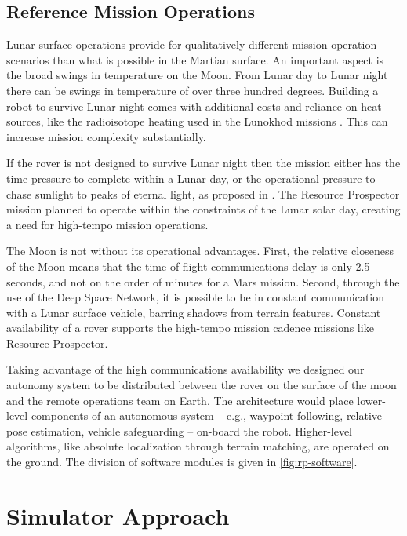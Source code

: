 \documentclass[twocolumn,letterpaper]{IEEEAerospaceCLS}  %
\begin{document}
\subsection{Reference Mission Operations}
Lunar surface operations provide for qualitatively different mission operation scenarios than what is possible in the Martian surface.
An important aspect is the broad swings in temperature on the Moon.  
From Lunar day to Lunar night there can be swings in temperature of over three hundred degrees.  
Building a robot to survive Lunar night comes with additional costs and reliance on heat sources, like the radioisotope heating used in the Lunokhod missions \cite{ulamec2010survive}.
This can increase mission complexity substantially.  

If the rover is not designed to survive Lunar night then the mission either has the time pressure to complete within a Lunar day, or the operational pressure to chase sunlight to peaks of eternal light, as proposed in \cite{otten2018strategic}.
The Resource Prospector mission planned to operate within the constraints of the Lunar solar day, creating a need for high-tempo mission operations. 

The Moon is not without its operational advantages.
First, the relative closeness of the Moon means that the time-of-flight communications delay is only 2.5 seconds, and not on the order of minutes for a Mars mission.  
Second, through the use of the Deep Space Network, it is possible to be in constant communication with a Lunar surface vehicle, barring shadows from terrain features.  
Constant availability of a rover supports the high-tempo mission cadence missions like Resource Prospector.

Taking advantage of the high communications availability we designed our autonomy system to be distributed between the rover on the surface of the moon and the remote operations team on Earth.  
The architecture would place lower-level components of an autonomous system -- e.g., waypoint following, relative pose estimation, vehicle safeguarding -- on-board the robot.
Higher-level algorithms, like absolute localization through terrain matching, are operated on the ground.
The division of software modules is given in \cref{fig:rp-software}.


\section{Simulator Approach}
\label{sec:sim-approach}
\end{document}
